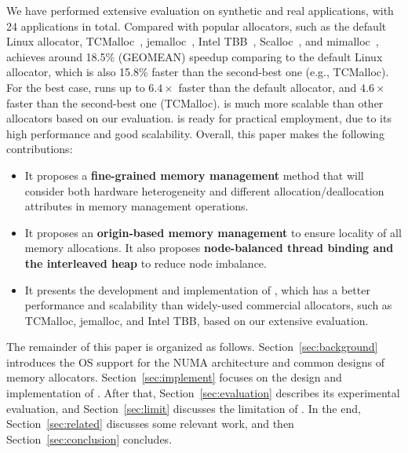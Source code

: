  


We have performed extensive evaluation on synthetic and real applications, with 24 applications in total. Compared \NM{} with popular allocators, such as the default Linux allocator, TCMalloc~\cite{tcmalloc}, jemalloc~\cite{jemalloc}, Intel TBB~\cite{tbb}, Scalloc~\cite{Scalloc}, and mimalloc~\cite{mimalloc},  \NM{} achieves around 18.5\%  (GEOMEAN) speedup comparing to the default Linux allocator, which is also 15.8\% faster than the second-best one (e.g., TCMalloc). For the best case, \NM{} runs up to $6.4\times$ faster than the default allocator, and $4.6\times$ faster than the second-best one (TCMalloc). \NM{} is much more scalable than other allocators based on our evaluation. \NM{} is ready for practical employment, due to its high performance and good scalability. Overall, this paper makes the following contributions:

\begin{itemize}

\item It proposes a \textbf{fine-grained memory management} method that will consider both hardware heterogeneity and different allocation/deallocation attributes in memory management operations.

\item It proposes an \textbf{origin-based memory management} to ensure locality of all memory allocations. It also proposes \textbf{node-balanced thread binding and the interleaved heap} to reduce node imbalance. 

\item It presents the development and implementation of \NM{}, which has a better performance and scalability than widely-used commercial allocators, such as TCMalloc, jemalloc, and Intel TBB, based on our extensive evaluation.  

\end{itemize}

The remainder of this paper is organized as follows. Section~\ref{sec:background} introduces the OS support for the NUMA architecture and common designs of memory allocators. Section~\ref{sec:implement} focuses on the design and implementation of \NM{}. After that, Section~\ref{sec:evaluation} describes its experimental evaluation, and Section~\ref{sec:limit} discusses the limitation of \NM{}. In the end, Section~\ref{sec:related} discusses some relevant work, and then Section~\ref{sec:conclusion} concludes. 